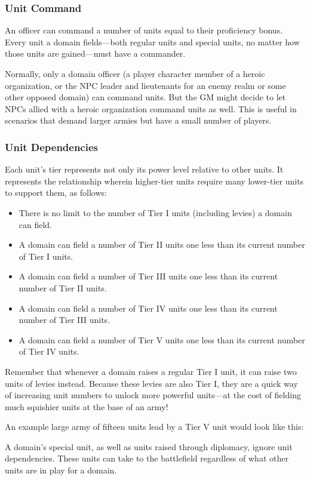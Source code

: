 \documentclass[10pt,a4paper,twoside,bg=print,twocolumn,openany,nodeprecatedcode]{dndbook}
\begin{document}
\subsubsection{Unit Command}
An officer can command a number of units equal to their proficiency bonus. Every unit a domain fields—both regular units and special units, no matter how those units are gained—must have a commander.

Normally, only a domain officer (a player character member of a heroic organization, or the NPC leader and lieutenants for an enemy realm or some other opposed domain) can command units. But the GM might decide to let NPCs allied with a heroic organization command units as well. This is useful in scenarios that demand larger armies but have a small number of players.

\subsubsection{Unit Dependencies}
Each unit's tier represents not only its power level relative to other units. It represents the relationship wherein higher-tier units require many lower-tier units to support them, as follows:


\begin{itemize}
\item There is no limit to the number of Tier I units (including levies) a domain can field.
\item A domain can field a number of Tier II units one less than its current number of Tier I units.
\item A domain can field a number of Tier III units one less than its current number of Tier II units.
\item A domain can field a number of Tier IV units one less than its current number of Tier III units.
\item A domain can field a number of Tier V units one less than its current number of Tier IV units.
\end{itemize}

Remember that whenever a domain raises a regular Tier I unit, it can raise two units of levies instead. Because these levies are also Tier I, they are a quick way of increasing unit numbers to unlock more powerful units—at the cost of fielding much squishier units at the base of an army!

An example large army of fifteen units lead by a Tier V unit would look like this:

A domain's special unit, as well as units raised through diplomacy, ignore unit dependencies. These units can take to the battlefield regardless of what other units are in play for a domain.
\end{document}
